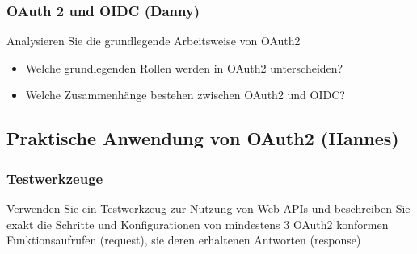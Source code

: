 \documentclass[notitlepage, hidelinks]{article}
\begin{document}
\subsubsection{OAuth 2 und OIDC (Danny)}
Analysieren Sie die grundlegende Arbeitsweise von OAuth2
\begin{itemize}
\item Welche grundlegenden Rollen werden in OAuth2 unterscheiden?
\item Welche Zusammenhänge bestehen zwischen OAuth2 und OIDC?
\end{itemize}

\subsection{Praktische Anwendung von OAuth2 (Hannes)}
\subsubsection{Testwerkzeuge}
Verwenden Sie ein Testwerkzeug zur Nutzung von Web APIs und beschreiben Sie exakt die Schritte und Konfigurationen von mindestens 3 OAuth2 konformen Funktionsaufrufen (request), sie deren erhaltenen Antworten (response)
\end{document}
